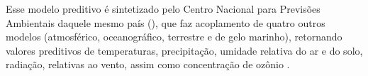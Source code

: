 \indent Esse modelo preditivo é sintetizado pelo Centro Nacional para Previsões Ambientais daquele mesmo país (), que faz acoplamento de quatro outros modelos (atmosférico, oceanográfico, terrestre e de gelo marinho), retornando valores preditivos de temperaturas, precipitação, umidade relativa do ar e do solo, radiação, relativas ao vento, assim como concentração de ozônio \cite{GFS24NOAA}.





